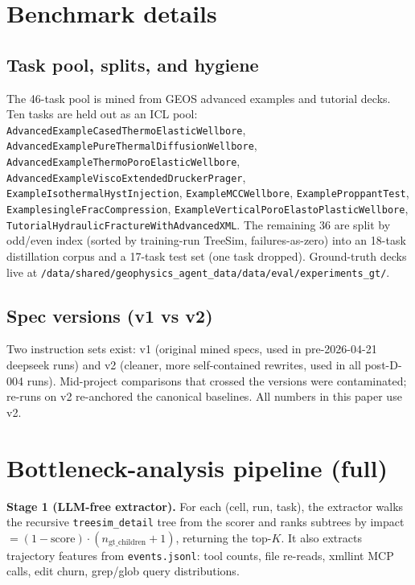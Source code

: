\documentclass{article}
\begin{document}
\medskip

{
\small
}





\appendix

\section{Benchmark details}
\label{app:bench}

\subsection{Task pool, splits, and hygiene}
The 46-task pool is mined from GEOS advanced examples and tutorial decks. Ten tasks are held out as an ICL pool: \texttt{AdvancedExampleCasedThermoElasticWellbore}, \texttt{AdvancedExamplePureThermalDiffusionWellbore}, \texttt{AdvancedExampleThermoPoroElasticWellbore}, \texttt{AdvancedExampleViscoExtendedDruckerPrager}, \texttt{ExampleIsothermalHystInjection}, \texttt{ExampleMCCWellbore}, \texttt{ExampleProppantTest}, \texttt{ExamplesingleFracCompression}, \texttt{ExampleVerticalPoroElastoPlasticWellbore}, \texttt{TutorialHydraulicFractureWithAdvancedXML}. The remaining 36 are split by odd/even index (sorted by training-run TreeSim, failures-as-zero) into an 18-task distillation corpus and a 17-task test set (one task dropped). Ground-truth decks live at \texttt{/data/shared/geophysics\_agent\_data/data/eval/experiments\_gt/}.

\subsection{Spec versions (v1 vs v2)}
Two instruction sets exist: v1 (original mined specs, used in pre-2026-04-21 deepseek runs) and v2 (cleaner, more self-contained rewrites, used in all post-D-004 runs). Mid-project comparisons that crossed the versions were contaminated; re-runs on v2 re-anchored the canonical baselines. All numbers in this paper use v2.

\section{Bottleneck-analysis pipeline (full)}
\label{app:bottleneck}

\textbf{Stage 1 (LLM-free extractor).} For each (cell, run, task), the extractor walks the recursive \texttt{treesim\_detail} tree from the scorer and ranks subtrees by impact $= (1 - \mathrm{score}) \cdot (n_{\mathrm{gt\_children}} + 1)$, returning the top-$K$. It also extracts trajectory features from \texttt{events.jsonl}: tool counts, file re-reads, xmllint MCP calls, edit churn, grep/glob query distributions.
\end{document}
